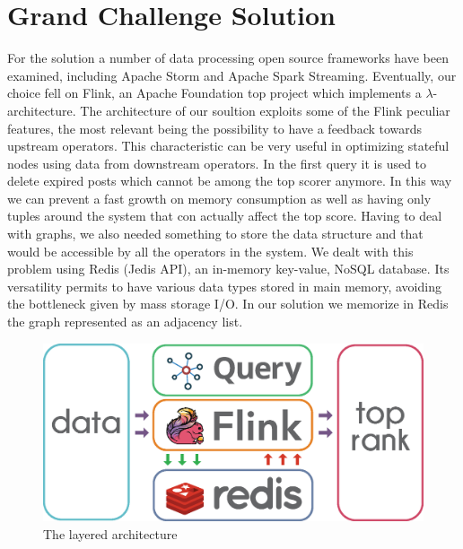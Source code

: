\section{Grand Challenge Solution}
\label{sec:solution}

For the solution a number of data processing open source frameworks have been examined, including Apache Storm and Apache Spark Streaming. Eventually, our choice fell on Flink, an Apache Foundation top project which implements a $\lambda$-architecture. The architecture of our soultion exploits some of the Flink peculiar features, the most relevant being the possibility to have a feedback 
towards upstream operators. This characteristic can be very useful in optimizing stateful nodes using data from downstream operators. In the first query it is used to delete expired posts which cannot be among the top scorer anymore. In this way we can prevent a fast growth on memory consumption as well as having only tuples around the system that con actually affect the top score.
Having to deal with graphs, we also needed something to store the data structure and that would be accessible by all the operators in the system. We dealt with this problem using Redis (Jedis API), an in-memory key-value, NoSQL database. Its versatility permits to have various data types stored in main memory, avoiding the bottleneck given by mass storage I/O. In our solution we memorize in Redis the graph represented as an adjacency list.

\begin{figure}
	\centering
	\includegraphics[width=\columnwidth]{fig/sostream-layered-architecture}
	\caption{The layered architecture}
	\label{fig:sostream-layered-architecture}
\end{figure}